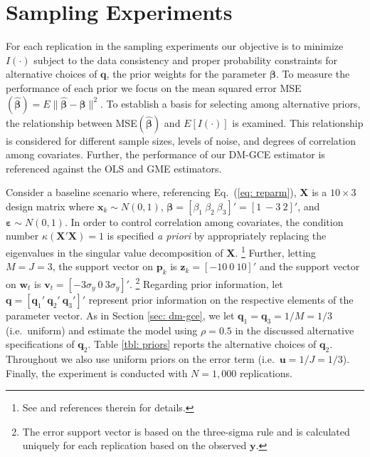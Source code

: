 \documentclass{elsarticle}
\begin{document}
\section{Sampling Experiments}
\label{sec: mce}

For each replication in the sampling experiments our objective is to minimize 
$I(\cdot)$ subject to the data consistency and proper probability constraints 
for alternative choices of $\mathbf{q}$, the prior weights for the parameter 
$\mathbf{\beta}$. 
To measure the performance of each prior we focus on the mean squared 
error MSE$(\hat{\mathbf{\beta}}) = E \| \hat{\mathbf{\beta}}- 
\mathbf{\beta}\|^2$.
To establish a basis for selecting among alternative priors, the relationship 
between MSE$(\hat{\mathbf{\beta}})$ and $E[I(\cdot)]$ is examined.
This relationship is considered for different sample sizes, levels of noise, 
and degrees of correlation among covariates.
Further, the performance of our DM-GCE estimator is referenced 
against the OLS and GME estimators.

Consider a baseline scenario where, referencing Eq.\ (\ref{eq: reparm}),
$\mathbf{X}$ is a $10 \times 3$ design matrix where $\mathbf{x}_k \sim 
N(0,1)$, $\mathbf{\beta}= [\beta_1 ~ \beta_2 ~ \beta_3]'=[1 ~ -3 ~ 2]'$, 
and $\mathbf{\varepsilon} \sim N(0,1)$.
In order to control correlation among covariates, the condition
number $\kappa(\mathbf{X}'\mathbf{X})=1$ is specified \textit{a priori}
by appropriately replacing the eigenvalues in the singular value 
decomposition of $\mathbf{X}$.%
\footnote{See \citet[pg.\ 133]{golan1996} and references therein for 
details.}
Further, letting $M=J=3$, the support vector on $\mathbf{p}_k$ is 
$\mathbf{z}_k = [- 10 ~ 0 ~ 10]'$ and the support vector on $\mathbf{w}_t$ 
is $\mathbf{v}_t = [- 3\sigma_y ~ 0 ~ 3\sigma_y]'$.%
\footnote{The error support vector is based on the three-sigma
rule \citep{pukelsheim1994} and is calculated 
uniquely for each replication based on the observed $\mathbf{y}$.}
Regarding prior information, let $\mathbf{q} = [\mathbf{q}_1' ~ 
\mathbf{q}_2' ~ \mathbf{q}_3']'$ represent prior information on the 
respective elements of the parameter vector.
As in Section \ref{sec: dm-gce}, we let $\mathbf{q}_1 = \mathbf{q}_3 = 1/M 
= 1/3$ (i.e.\ uniform) and estimate the model using $\rho=0.5$  in the 
discussed alternative specifications of $\mathbf{q}_2$.
Table \ref{tbl: priors} reports the alternative choices of $\mathbf{q}_2$.
Throughout we also use uniform priors on the error term 
(i.e.\ $\mathbf{u} = 1/J = 1/3$).
Finally, the experiment is conducted with $N=1,000$ replications.
\end{document}
